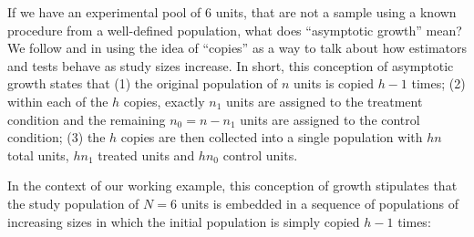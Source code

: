 \documentclass[12pt,leqno]{article}
\theoremstyle{newstyle}
\begin{document}
If we have an experimental pool of 6 units, that are not a sample using
a known procedure from a well-defined population, what does
\enquote{asymptotic growth} mean? We follow \citet{brewer1979} and
\citet{middletonaronow2015} in using the idea of \enquote{copies} as a
way to talk about how estimators and tests behave as study sizes
increase. In short, this conception of asymptotic growth states that (1)
the original population of \(n\) units is copied \(h - 1\) times; (2)
within each of the \(h\) copies, exactly \(n_1\) units are assigned to
the treatment condition and the remaining \(n_0 = n - n_1\) units are
assigned to the control condition; (3) the \(h\) copies are then
collected into a single population with \(h n\) total units, \(h n_1\)
treated units and \(h n_0\) control units.

In the context of our working example, this conception of growth
stipulates that the study population of \(N = 6\) units is embedded in a
sequence of populations of increasing sizes in which the initial
population is simply copied \(h - 1\) times:
\end{document}
